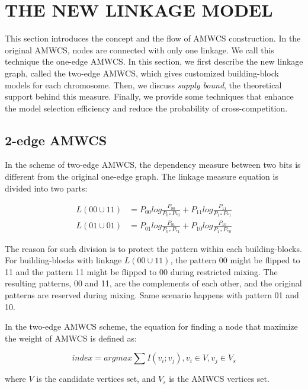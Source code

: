 \documentclass{sig-alternate-05-2015}
\begin{document}
\section{THE NEW LINKAGE MODEL}
This section introduces the concept and the flow of AMWCS construction. In the original AMWCS, nodes are connected with only one linkage. We call this technique the one-edge AMWCS. In this section, we first describe the new linkage graph, called the two-edge AMWCS, which gives customized building-block models for each chromosome. Then, we discuss \textit{supply bound}, the theoretical support behind this measure. Finally, we provide some techniques that enhance the model selection efficiency and reduce the probability of cross-competition. 

\subsection{2-edge AMWCS}
In the scheme of two-edge AMWCS, the dependency measure between two bits is different from the original one-edge graph. The linkage measure equation is divided into two parts:

\begin{equation} 
\begin{split}
L( 00 \cup 11 ) &= P_{00 }log\frac{P_{00}}{P_{0*} P_{*0}} + P_{11 }log\frac{P_{11}}{P_{1*} P_{*1}}  \\
L( 01 \cup 01 ) &= P_{01 }log\frac{P_{01}}{P_{0*} P_{*1}} + P_{10 }log\frac{P_{10}}{P_{1*} P_{*0}}  
\end{split}
\end{equation}

The reason for such division is to protect the pattern within each building-blocks. For building-blocks with linkage  $L(00\cup11)$, the pattern 00 might be flipped to 11 and the pattern 11 might be flipped to 00 during restricted mixing. The resulting patterns, 00 and 11, are the complements of each other, and the original patterns are reserved during mixing. Same scenario happens with pattern 01 and 10.


In the two-edge AMWCS scheme, the equation for finding a node that maximize the weight of AMWCS is defined as:

\begin{equation} \textit{index} = argmax\sum I(v_i;v_j), {v_i\in V}, {v_j \in V_s}\end{equation}

where $V$ is the candidate vertices set, and $V_s$ is the AMWCS vertices set.
\end{document}
